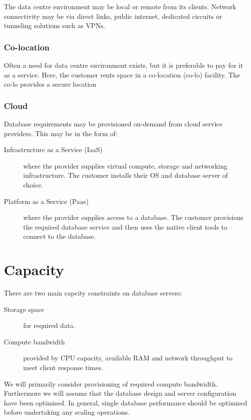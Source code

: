 \documentclass[slides]{pgnotes}
\begin{document}
The data centre environment may be local or remote from its clients.
Network connectivity may be via direct links, public internet, dedicated circuits or tunneling solutions such as VPNs. 


\subsubsection{Co-location}

Often a need for data centre environment exists, but it is preferable to pay for it as a service.
Here, the customer rents space in a co-location (co-lo) facility.
The co-lo provides a secure location 

\subsubsection{Cloud}

Database requirements may be provisioned on-demand from cloud service providers.
This may be in the form of:
\begin{description}
\item[Infrastructure as a Service (IaaS)] where the provider supplies virtual compute, storage and networking infrastructure.
  The customer installs their OS and database server of choice. 
\item[Platform as a Service (Paas)] where the provider supplies access to a database.
  The customer provisions the required database service and then uses the native client tools to connect to the database. 
\end{description}



\section{Capacity}

There are two main capcity constraints on database servers:
\begin{description}
\item[Storage space] for required data.
\item[Compute bandwidth] provided by CPU capacity, available RAM and network throughput to meet client response times.
\end{description}
We will primarily consider provisioning of required compute bandwidth.
Furthermore we will assume that the database design and server configuration have been optimised.
In general, single database performance should be optimised before undertaking any scaling operations. 
\end{document}
